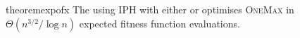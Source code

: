 %
%
%


\begin{restatable}{theorem}{expofx} \label{cor:omexpohd}
The {\oneoneIA } using IPH with either {\expoF } or {\expoHD } optimises \textsc{OneMax} in $\Theta(n^{3/2}/\log n)$ expected fitness function evaluations.
\end{restatable}

